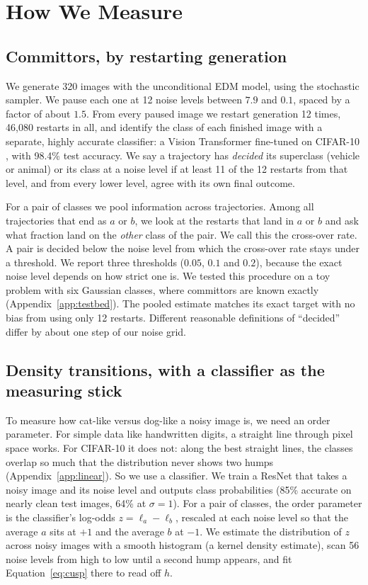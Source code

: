 \documentclass[11pt]{article}
\begin{document}
\section{How We Measure}
\label{sec:instruments}

\subsection{Committors, by restarting generation}
\label{sec:branching}

We generate 320 images with the unconditional EDM model, using the stochastic sampler. We pause each one at 12 noise levels between $7.9$ and $0.1$, spaced by a factor of about $1.5$. From every paused image we restart generation 12 times, 46{,}080 restarts in all, and identify the class of each finished image with a separate, highly accurate classifier: a Vision Transformer fine-tuned on CIFAR-10 \citep{dosovitskiy2021image}, with 98.4\% test accuracy. We say a trajectory has \emph{decided} its superclass (vehicle or animal) or its class at a noise level if at least 11 of the 12 restarts from that level, and from every lower level, agree with its own final outcome.

For a pair of classes we pool information across trajectories. Among all trajectories that end as $a$ or $b$, we look at the restarts that land in $a$ or $b$ and ask what fraction land on the \emph{other} class of the pair. We call this the cross-over rate. A pair is decided below the noise level from which the cross-over rate stays under a threshold. We report three thresholds ($0.05$, $0.1$ and $0.2$), because the exact noise level depends on how strict one is. We tested this procedure on a toy problem with six Gaussian classes, where committors are known exactly (Appendix~\ref{app:testbed}). The pooled estimate matches its exact target with no bias from using only 12 restarts. Different reasonable definitions of ``decided'' differ by about one step of our noise grid.

\subsection{Density transitions, with a classifier as the measuring stick}
\label{sec:density}

To measure how cat-like versus dog-like a noisy image is, we need an order parameter. For simple data like handwritten digits, a straight line through pixel space works. For CIFAR-10 it does not: along the best straight lines, the classes overlap so much that the distribution never shows two humps (Appendix~\ref{app:linear}). So we use a classifier. We train a ResNet that takes a noisy image and its noise level and outputs class probabilities (85\% accurate on nearly clean test images, 64\% at $\sigma=1$). For a pair of classes, the order parameter is the classifier's log-odds $z=\ell_a-\ell_b$, rescaled at each noise level so that the average $a$ sits at $+1$ and the average $b$ at $-1$. We estimate the distribution of $z$ across noisy images with a smooth histogram (a kernel density estimate), scan 56 noise levels from high to low until a second hump appears, and fit Equation~\eqref{eq:cusp} there to read off $h$.
\end{document}
